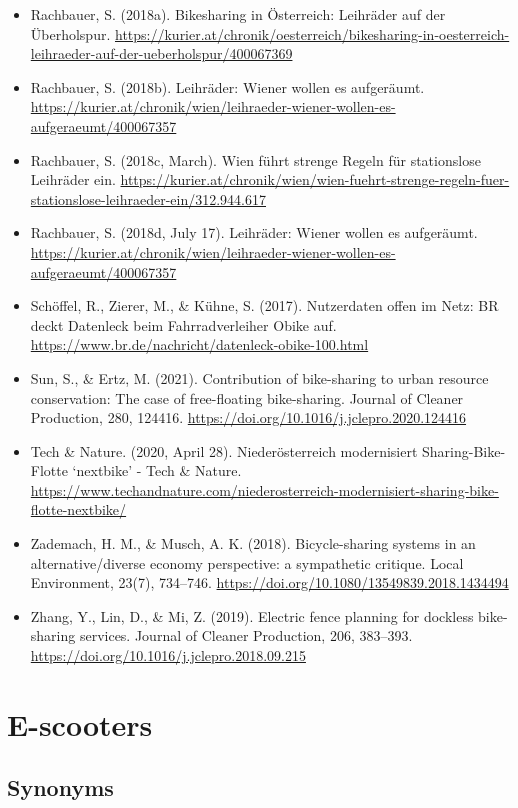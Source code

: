 \documentclass[
]{book}
\begin{document}
\begin{itemize}
\item
  Rachbauer, S. (2018a). Bikesharing in Österreich: Leihräder auf der Überholspur. \url{https://kurier.at/chronik/oesterreich/bikesharing-in-oesterreich-leihraeder-auf-der-ueberholspur/400067369}
\item
  Rachbauer, S. (2018b). Leihräder: Wiener wollen es aufgeräumt. \url{https://kurier.at/chronik/wien/leihraeder-wiener-wollen-es-aufgeraeumt/400067357}
\item
  Rachbauer, S. (2018c, March). Wien führt strenge Regeln für stationslose Leihräder ein. \url{https://kurier.at/chronik/wien/wien-fuehrt-strenge-regeln-fuer-stationslose-leihraeder-ein/312.944.617}
\item
  Rachbauer, S. (2018d, July 17). Leihräder: Wiener wollen es aufgeräumt. \url{https://kurier.at/chronik/wien/leihraeder-wiener-wollen-es-aufgeraeumt/400067357}
\item
  Schöffel, R., Zierer, M., \& Kühne, S. (2017). Nutzerdaten offen im Netz: BR deckt Datenleck beim Fahrradverleiher Obike auf. \url{https://www.br.de/nachricht/datenleck-obike-100.html}
\item
  Sun, S., \& Ertz, M. (2021). Contribution of bike-sharing to urban resource conservation: The case of free-floating bike-sharing. Journal of Cleaner Production, 280, 124416. \url{https://doi.org/10.1016/j.jclepro.2020.124416}
\item
  Tech \& Nature. (2020, April 28). Niederösterreich modernisiert Sharing-Bike-Flotte `nextbike' - Tech \& Nature. \url{https://www.techandnature.com/niederosterreich-modernisiert-sharing-bike-flotte-nextbike/}
\item
  Zademach, H. M., \& Musch, A. K. (2018). Bicycle-sharing systems in an alternative/diverse economy perspective: a sympathetic critique. Local Environment, 23(7), 734--746. \url{https://doi.org/10.1080/13549839.2018.1434494}
\item
  Zhang, Y., Lin, D., \& Mi, Z. (2019). Electric fence planning for dockless bike-sharing services. Journal of Cleaner Production, 206, 383--393. \url{https://doi.org/10.1016/j.jclepro.2018.09.215}
\end{itemize}

\hypertarget{scooters}{%
\section{E-scooters}\label{scooters}}

\hypertarget{synonyms-41}{%
\subsection*{Synonyms}\label{synonyms-41}}
\end{document}
